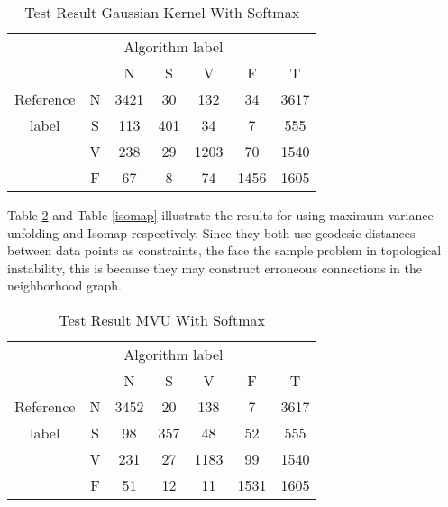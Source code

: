 \documentclass[journal]{IEEEtran}
\begin{document}
\begin{table}[!htbp]
\begin{center}
\begin{threeparttable}
\caption{Test Result Gaussian Kernel With Softmax}
\label{kpca}
\begin{tabular}{ccccccc}
\hline
\multicolumn{5}{r}{Algorithm label} \\
\cline{3-6}
		&  & N & S      & V    & F       & T\\
\hline
 Reference & N & 3421 &  30  &  132  & 34    &  3617 \\
	label  & S & 113     & 401  &  34   & 7    &  555\\
		   & V & 238  & 29   & 1203 & 70    &  1540\\
		   & F & 67    & 8    & 74    & 1456   &  1605\\		
\hline
\end{tabular}
\end{threeparttable}
\end{center}
\end{table}


Table \ref{mvu} and Table \ref{isomap} illustrate the results for using maximum variance unfolding and Isomap respectively. Since they both use geodesic distances between data points as constraints, the face the sample problem in topological instability, this is because they may construct erroneous connections in the neighborhood graph. 
\begin{table}[!htbp]
\begin{center}
\begin{threeparttable}
\caption{Test Result MVU With Softmax}
\label{mvu}
\begin{tabular}{ccccccc}
\hline
\multicolumn{5}{r}{Algorithm label} \\
\cline{3-6}
		&  & N & S      & V    & F       & T\\
\hline
 Reference & N & 3452 &  20  &  138   & 7   &  3617 \\
	label  & S &  98    & 357  &  48   & 52   &  555\\
		   & V &  231    & 27    & 1183 & 99    &  1540\\
		   & F &  51    & 12    & 11    & 1531   &  1605\\		
\hline
\end{tabular}
\end{threeparttable}
\end{center}
\end{table}
\end{document}
